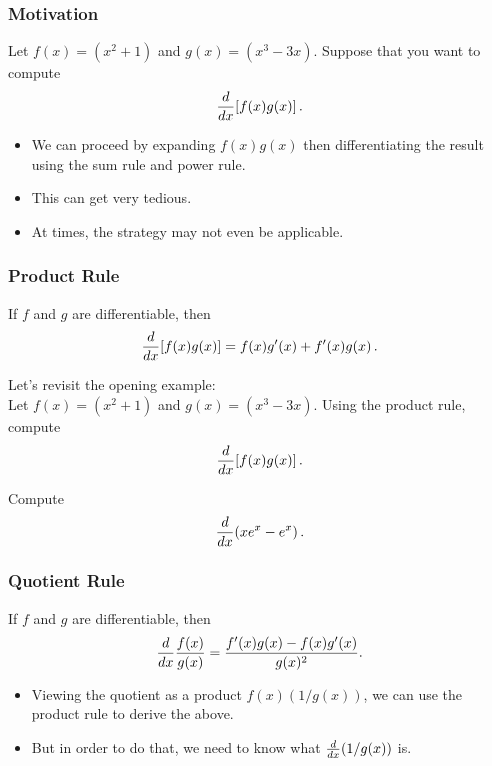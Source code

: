 \documentclass[10pt,t,presentation,ignorenonframetext,aspectratio=169]{beamer}
\title[\course]{\lecTitle}
\institute[Ohio State]
{
  \medskip
}
\date[\week]{\semester}
\author{Tae Eun Kim, Ph.D.}
\begin{document}
\begin{frame}
  \titlepage
\end{frame}

\begin{frame}
  \frametitle{Motivation}
  \vs
  \question{} Let $f(x)=(x^2+1)$ and $g(x)=(x^3-3x)$. Suppose that
  you want to compute
  \[
    \frac{d}{\mathop{}\!d x} [f(x)g(x)] \,.
  \]
  \begin{itemize}
  \item We can proceed by expanding $f(x)g(x)$ then differentiating
    the result using the sum rule and power rule.
  \item This can get very tedious.
  \item At times, the strategy may not even be applicable.
  \end{itemize}
\end{frame}

\begin{frame}
  \frametitle{Product Rule}
  \begin{thm}
    If $f$ and $g$ are differentiable, then
    \[
      \frac{d}{\mathop{}\!d x} [f(x)g(x)] = f(x)g'(x)+f'(x)g(x) \,.
    \]
  \end{thm}
\end{frame}

\begin{frame}
  \vs
  Let's revisit the opening example: \\ \vspace{0.5em}
  \question{}  Let $f(x)=(x^2+1)$ and $g(x)=(x^3-3x)$. Using the
  product rule, compute
  \[
    \frac{d}{\mathop{}\!d x} [f(x)g(x)] \,.
  \]
\end{frame}

\begin{frame}
  \vs
  \question{} Compute
  \[
    \frac{d}{\mathop{}\!d x}(xe^x-e^x) \,.
  \]
\end{frame}

\begin{frame}
  \frametitle{Quotient Rule}
  \begin{thm}
    If $f$ and $g$ are differentiable, then
    \[
      \frac{d}{\mathop{}\!d x} \frac{f(x)}{g(x)} = \frac{f'(x)g(x)-f(x)g'(x)}{g(x)^2}.
    \]
  \end{thm}

  \begin{itemize}
  \item Viewing the quotient as a product $f(x) (1/g(x))$, we can use the
    product rule to derive the above.
  \item But in order to do that, we need to know what $\frac{d}{\mathop{}\!d x} (1/g(x))$
    is.
  \end{itemize}

\end{frame}
\end{document}
